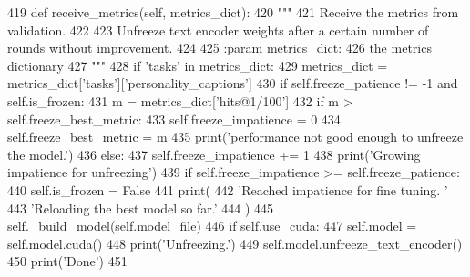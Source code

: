 \begin{DoxyCode}
419     \textcolor{keyword}{def }receive\_metrics(self, metrics\_dict):
420         \textcolor{stringliteral}{"""}
421 \textcolor{stringliteral}{        Receive the metrics from validation.}
422 \textcolor{stringliteral}{}
423 \textcolor{stringliteral}{        Unfreeze text encoder weights after a certain number of rounds without improvement.}
424 \textcolor{stringliteral}{}
425 \textcolor{stringliteral}{        :param metrics\_dict:}
426 \textcolor{stringliteral}{            the metrics dictionary}
427 \textcolor{stringliteral}{        """}
428         \textcolor{keywordflow}{if} \textcolor{stringliteral}{'tasks'} \textcolor{keywordflow}{in} metrics\_dict:
429             metrics\_dict = metrics\_dict[\textcolor{stringliteral}{'tasks'}][\textcolor{stringliteral}{'personality\_captions'}]
430         \textcolor{keywordflow}{if} self.freeze\_patience != -1 \textcolor{keywordflow}{and} self.is\_frozen:
431             m = metrics\_dict[\textcolor{stringliteral}{'hits@1/100'}]
432             \textcolor{keywordflow}{if} m > self.freeze\_best\_metric:
433                 self.freeze\_impatience = 0
434                 self.freeze\_best\_metric = m
435                 print(\textcolor{stringliteral}{'performance not good enough to unfreeze the model.'})
436             \textcolor{keywordflow}{else}:
437                 self.freeze\_impatience += 1
438                 print(\textcolor{stringliteral}{'Growing impatience for unfreezing'})
439                 \textcolor{keywordflow}{if} self.freeze\_impatience >= self.freeze\_patience:
440                     self.is\_frozen = \textcolor{keyword}{False}
441                     print(
442                         \textcolor{stringliteral}{'Reached impatience for fine tuning. '}
443                         \textcolor{stringliteral}{'Reloading the best model so far.'}
444                     )
445                     self.\_build\_model(self.model\_file)
446                     \textcolor{keywordflow}{if} self.use\_cuda:
447                         self.model = self.model.cuda()
448                     print(\textcolor{stringliteral}{'Unfreezing.'})
449                     self.model.unfreeze\_text\_encoder()
450                     print(\textcolor{stringliteral}{'Done'})
451 
\end{DoxyCode}
\mbox{\label{classprojects_1_1personality__captions_1_1transresnet_1_1transresnet_1_1TransresnetAgent_a1bbc4e55caf459f68c67a9baa202605a}} 
